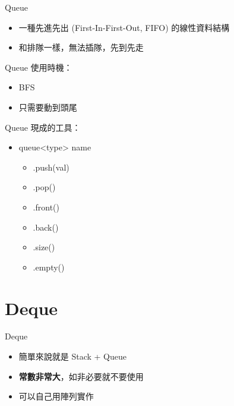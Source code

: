 \documentclass[mathserif]{beamer}
\begin{document}
\begin{frame}{Queue}
    \begin{itemize}
        \item 一種先進先出 (First-In-First-Out, FIFO) 的線性資料結構
        \item 和排隊一樣，無法插隊，先到先走
    \end{itemize}
\end{frame}

\begin{frame}{Queue}
    使用時機：
    \begin{itemize}
        \item BFS
        \item 只需要動到頭尾
    \end{itemize}
\end{frame}

\begin{frame}{Queue}
    現成的工具：
    \begin{itemize}
        \item queue<{\color{red}type}> {\color{red}name}
        \begin{itemize}
            \item .push({\color{red}val})
            \item .pop()
            \item .front()
            \item .back()
            \item .size()
            \item .empty()
        \end{itemize}
    \end{itemize}
\end{frame}

\section{Deque}

\begin{frame}{Deque}
    \begin{itemize}
        \item 簡單來說就是 Stack + Queue
        \item \textbf{常數非常大}，如非必要就不要使用
        \item 可以自己用陣列實作
    \end{itemize}
\end{frame}
\end{document}

